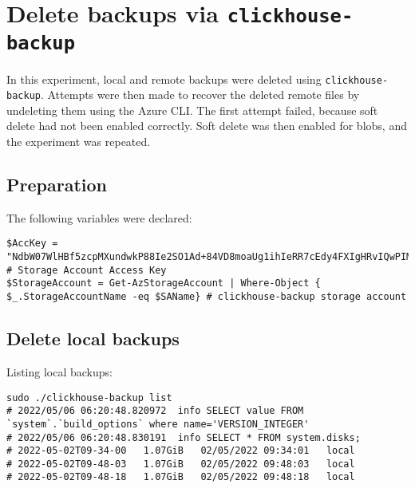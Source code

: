 \section{Delete backups via \texttt{clickhouse-backup}}
\label{app:chs2e2}
In this experiment, local and remote backups were deleted using \texttt{clickhouse-backup}.
Attempts were then made to recover the deleted remote files by undeleting them using the Azure CLI.
The first attempt failed, because soft delete had not been enabled correctly.
Soft delete was then enabled for blobs, and the experiment was repeated.

\subsection{Preparation}
\label{sec:orgde09cc4}
The following variables were declared:
\begin{verbatim}
$AccKey = "NdbW07WlHBf5zcpMXundwkP88Ie2SO1Ad+84VD8moaUg1ihIeRR7cEdy4FXIgHRvIQwPIMc7eD2q+ASt6EqxWg==" # Storage Account Access Key
$StorageAccount = Get-AzStorageAccount | Where-Object { $_.StorageAccountName -eq $SAName} # clickhouse-backup storage account
\end{verbatim}

\subsection{Delete local backups}
\label{sec:orgc3afe18}
Listing local backups:
\begin{verbatim}
sudo ./clickhouse-backup list
# 2022/05/06 06:20:48.820972  info SELECT value FROM `system`.`build_options` where name='VERSION_INTEGER'
# 2022/05/06 06:20:48.830191  info SELECT * FROM system.disks;
# 2022-05-02T09-34-00   1.07GiB   02/05/2022 09:34:01   local
# 2022-05-02T09-48-03   1.07GiB   02/05/2022 09:48:03   local
# 2022-05-02T09-48-18   1.07GiB   02/05/2022 09:48:18   local
\end{verbatim}

